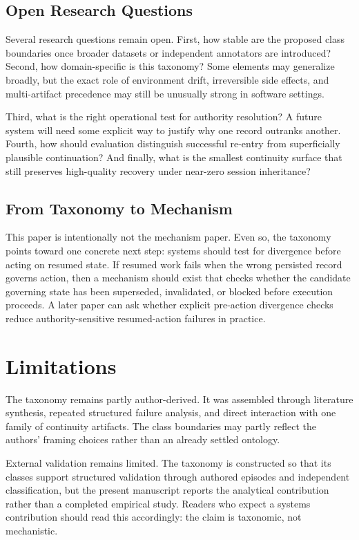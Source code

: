 \documentclass[a4paper,fleqn]{cas-dc}
\begin{document}
\subsection{Open Research Questions}

Several research questions remain open. First, how stable are the proposed class boundaries once broader datasets or independent annotators are introduced? Second, how domain-specific is this taxonomy? Some elements may generalize broadly, but the exact role of environment drift, irreversible side effects, and multi-artifact precedence may still be unusually strong in software settings.

Third, what is the right operational test for authority resolution? A future system will need some explicit way to justify why one record outranks another. Fourth, how should evaluation distinguish successful re-entry from superficially plausible continuation? And finally, what is the smallest continuity surface that still preserves high-quality recovery under near-zero session inheritance?

\subsection{From Taxonomy to Mechanism}

This paper is intentionally not the mechanism paper. Even so, the taxonomy points toward one concrete next step: systems should test for divergence before acting on resumed state. If resumed work fails when the wrong persisted record governs action, then a mechanism should exist that checks whether the candidate governing state has been superseded, invalidated, or blocked before execution proceeds. A later paper can ask whether explicit pre-action divergence checks reduce authority-sensitive resumed-action failures in practice.

\section{Limitations}
\label{sec:limitations}

The taxonomy remains partly author-derived. It was assembled through literature synthesis, repeated structured failure analysis, and direct interaction with one family of continuity artifacts. The class boundaries may partly reflect the authors' framing choices rather than an already settled ontology.

External validation remains limited. The taxonomy is constructed so that its classes support structured validation through authored episodes and independent classification, but the present manuscript reports the analytical contribution rather than a completed empirical study. Readers who expect a systems contribution should read this accordingly: the claim is taxonomic, not mechanistic.
\end{document}
